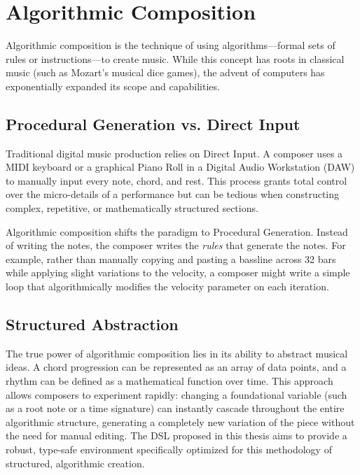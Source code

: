 \section{Algorithmic Composition}\label{sec:background-algorithmic-composition}

Algorithmic composition is the technique of using algorithms—formal sets of rules or instructions—to create music.
While this concept has roots in classical music (such as Mozart's musical dice games), the advent of computers has
exponentially expanded its scope and capabilities.

\subsection{Procedural Generation vs. Direct Input}\label{subsec:procedural-generation-vs.-direct-input}

Traditional digital music production relies on Direct Input.
A composer uses a MIDI keyboard or a graphical Piano Roll in a Digital Audio Workstation (DAW) to manually input every
note, chord, and rest.
This process grants total control over the micro-details of a performance but can be tedious when constructing complex,
repetitive, or mathematically structured sections.

Algorithmic composition shifts the paradigm to Procedural Generation.
Instead of writing the notes, the composer writes the \textit{rules} that generate the notes.
For example, rather than manually copying and pasting a bassline across 32 bars while applying slight variations to the
velocity, a composer might write a simple loop that algorithmically modifies the velocity parameter on each iteration.

\subsection{Structured Abstraction}\label{subsec:structured-abstraction}

The true power of algorithmic composition lies in its ability to abstract musical ideas.
A chord progression can be represented as an array of data points, and a rhythm can be defined as a mathematical
function over time.
This approach allows composers to experiment rapidly: changing a foundational variable (such as a root note or a time
signature) can instantly cascade throughout the entire algorithmic structure, generating a completely new variation of
the piece without the need for manual editing.
The DSL proposed in this thesis aims to provide a robust, type-safe environment specifically optimized for this
methodology of structured, algorithmic creation.
